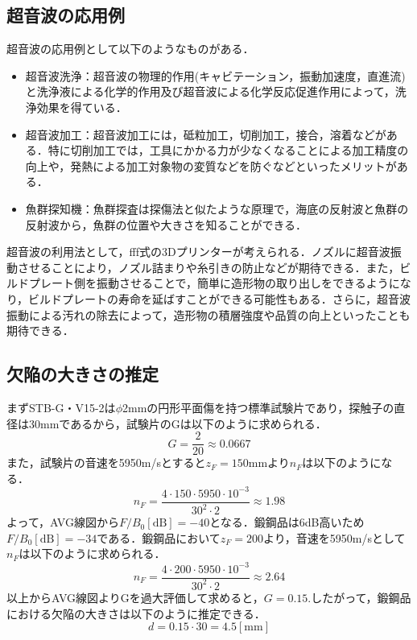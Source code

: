 \subsection{超音波の応用例}
超音波の応用例として以下のようなものがある．
\begin{itemize}
    \item 超音波洗浄：超音波の物理的作用(キャビテーション，振動加速度，直進流)と洗浄液による化学的作用及び超音波による化学反応促進作用によって，洗浄効果を得ている．
    \item 超音波加工：超音波加工には，砥粒加工，切削加工，接合，溶着などがある．特に切削加工では，工具にかかる力が少なくなることによる加工精度の向上や，発熱による加工対象物の変質などを防ぐなどといったメリットがある．
    \item 魚群探知機：魚群探査は探傷法と似たような原理で，海底の反射波と魚群の反射波から，魚群の位置や大きさを知ることができる．
\end{itemize}

超音波の利用法として，fff式の3Dプリンターが考えられる．ノズルに超音波振動させることにより，ノズル詰まりや糸引きの防止などが期待できる．また，ビルドプレート側を振動させることで，簡単に造形物の取り出しをできるようになり，ビルドプレートの寿命を延ばすことができる可能性もある．さらに，超音波振動による汚れの除去によって，造形物の積層強度や品質の向上といったことも期待できる．


\subsection{欠陥の大きさの推定}
まずSTB-G・V15-2は$\phi$2mmの円形平面傷を持つ標準試験片であり，探触子の直径は30mmであるから，試験片のGは以下のように求められる．
\begin{equation}
    \label{eq:試験片G}
    G = \frac{2}{20} \approx 0.0667
\end{equation}
また，試験片の音速を5950m/sとすると$z_F = 150$mmより$n_F$は以下のようになる．
\begin{equation}
    \label{eq:試験片nF}
    n_F = \frac{4 \cdot 150 \cdot 5950 \cdot 10^{-3}}{30^2 \cdot 2} \approx 1.98
\end{equation}
よって，AVG線図から$F/B_0\mathrm{[dB]} = -40$となる．鍛鋼品は6dB高いため$F/B_0\mathrm{[dB]} = -34$である．鍛鋼品において$z_F = 200$より，音速を5950m/sとして$n_F$は以下のように求められる．
\begin{equation}
    \label{eq:鍛鋼品nF}
    n_F = \frac{4 \cdot 200 \cdot 5950 \cdot 10^{-3}}{30^2 \cdot 2} \approx 2.64
\end{equation}
以上からAVG線図よりGを過大評価して求めると，$G = 0.15$.したがって，鍛鋼品における欠陥の大きさは以下のように推定できる．
\begin{equation}
    \label{eq:鍛鋼品d}
    d = 0.15 \cdot 30 = 4.5\mathrm{[mm]}
\end{equation}
